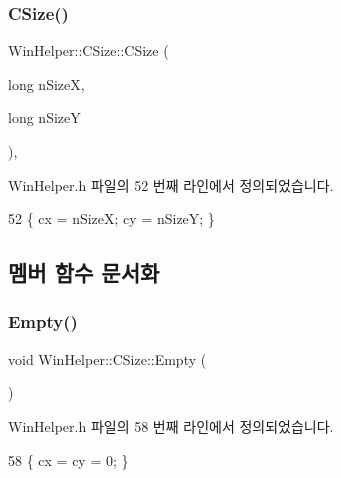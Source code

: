 \subsubsection{\texorpdfstring{C\+Size()}{CSize()}\hspace{0.1cm}{\footnotesize\ttfamily [3/3]}}
{\footnotesize\ttfamily Win\+Helper\+::\+C\+Size\+::\+C\+Size (\begin{DoxyParamCaption}\item[{long}]{n\+SizeX,  }\item[{long}]{n\+SizeY }\end{DoxyParamCaption})\hspace{0.3cm}{\ttfamily [inline]}, {\ttfamily [explicit]}}



Win\+Helper.\+h 파일의 52 번째 라인에서 정의되었습니다.


\begin{DoxyCode}
52 \{ cx = nSizeX; cy = nSizeY; \}
\end{DoxyCode}


\subsection{멤버 함수 문서화}
\mbox{\label{class_win_helper_1_1_c_size_a8ee92c406fa48d19ceaf5709d372126c}} 
\subsubsection{\texorpdfstring{Empty()}{Empty()}}
{\footnotesize\ttfamily void Win\+Helper\+::\+C\+Size\+::\+Empty (\begin{DoxyParamCaption}{ }\end{DoxyParamCaption})\hspace{0.3cm}{\ttfamily [inline]}}



Win\+Helper.\+h 파일의 58 번째 라인에서 정의되었습니다.


\begin{DoxyCode}
58 \{ cx = cy = 0; \}
\end{DoxyCode}
\mbox{\label{class_win_helper_1_1_c_size_a44e73f4780871e2980e00c9666de3fb9}} 
